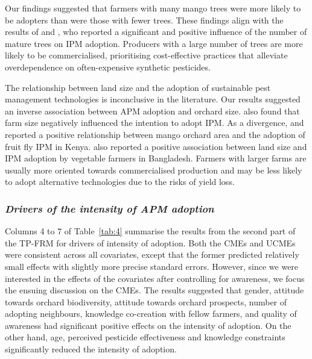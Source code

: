 \documentclass[fleqn,twoside,reqno]{article}
\begin{document}
Our findings suggested that farmers with many mango trees were more likely to be adopters than were those with fewer trees. These findings align with the results of \cite{Korir2015} and \cite{Mwungu2020}, who reported a significant and positive influence of the number of mature trees on IPM adoption. Producers with a large number of trees are more likely to be commercialised, prioritising cost-effective practices that alleviate overdependence on often-expensive synthetic pesticides.

The relationship between land size and the adoption of sustainable pest management technologies is inconclusive in the literature. Our results suggested an inverse association between APM adoption and orchard size. \cite{Despotovic2019} also found that farm size negatively influenced the intention to adopt IPM. As a divergence, \cite{Mwungu2020} and \cite{Wangithi2021} reported a positive relationship between mango orchard area and the adoption of fruit fly IPM in Kenya. \cite{Sadique2022} also reported a positive association between land size and IPM adoption by vegetable farmers in Bangladesh. Farmers with larger farms are usually more oriented towards commercialised production and may be less likely to adopt alternative technologies due to the risks of yield loss.

\subsubsection{\textit{Drivers of the intensity of APM adoption}}
Columns 4 to 7 of Table~\ref{tab:4} summarise the results from the second part of the TP-FRM for drivers of intensity of adoption. Both the CMEs and UCMEs were consistent across all covariates, except that the former predicted relatively small effects with slightly more precise standard errors. However, since we were interested in the effects of the covariates after controlling for awareness, we focus the ensuing discussion on the CMEs. The results suggested that gender, attitude towards orchard biodiversity, attitude towards orchard prospects, number of adopting neighbours, knowledge co-creation with fellow farmers, and quality of awareness had significant positive effects on the intensity of adoption. On the other hand, age, perceived pesticide effectiveness and knowledge constraints significantly reduced the intensity of adoption.
\end{document}
